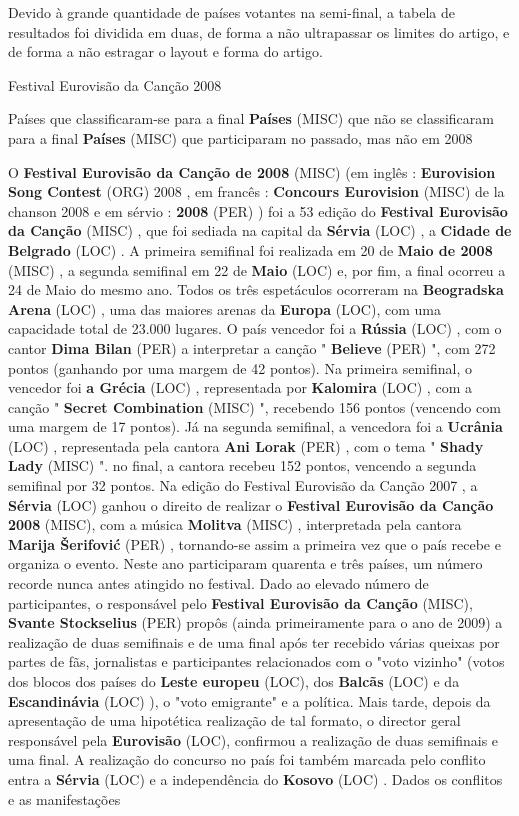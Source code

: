 \documentclass[12pt,a4paper]{article}
\begin{document}
Devido à grande quantidade de países votantes na semi-final, a tabela de resultados foi dividida em duas, de forma a não ultrapassar os limites do artigo, e de forma a não estragar o layout e forma do artigo.



Festival Eurovisão da Canção 2008



Países que classificaram-se para a final \textbf{Países} (MISC) que não se classificaram para a final \textbf{Países} (MISC) que participaram no passado, mas não em 2008

O \textbf{Festival Eurovisão da Canção de 2008} (MISC) (em inglês : \textbf{Eurovision Song Contest} (ORG) 2008 , em francês : \textbf{Concours Eurovision} (MISC) de la chanson 2008 e em sérvio : \textbf{  2008} (PER) ) foi a 53 edição do \textbf{Festival Eurovisão da Canção} (MISC) , que foi sediada na capital da \textbf{Sérvia} (LOC) , a \textbf{Cidade de Belgrado} (LOC) . A primeira semifinal foi realizada em 20 de \textbf{Maio de 2008} (MISC) , a segunda semifinal em 22 de \textbf{Maio} (LOC) e, por fim, a final ocorreu a 24 de Maio do mesmo ano. Todos os três espetáculos ocorreram na \textbf{Beogradska Arena} (LOC) , uma das maiores arenas da \textbf{Europa} (LOC), com uma capacidade total de 23.000 lugares. O país vencedor foi a \textbf{Rússia} (LOC) , com o cantor \textbf{Dima Bilan} (PER) a interpretar a canção " \textbf{Believe} (PER) ", com 272 pontos (ganhando por uma margem de 42 pontos). Na primeira semifinal, o vencedor foi \textbf{a Grécia} (LOC) , representada por \textbf{Kalomira} (LOC) , com a canção " \textbf{Secret Combination} (MISC) ", recebendo 156 pontos (vencendo com uma margem de 17 pontos). Já na segunda semifinal, a vencedora foi a \textbf{Ucrânia} (LOC) , representada pela cantora \textbf{Ani Lorak} (PER) , com o tema " \textbf{Shady Lady} (MISC) ". no final, a cantora recebeu 152 pontos, vencendo a segunda semifinal por 32 pontos. Na edição do Festival Eurovisão da Canção 2007 , a \textbf{Sérvia} (LOC) ganhou o direito de realizar o \textbf{Festival Eurovisão da Canção 2008} (MISC), com a música \textbf{Molitva} (MISC) , interpretada pela cantora \textbf{Marija Šerifović} (PER) , tornando-se assim a primeira vez que o país recebe e organiza o evento. Neste ano participaram quarenta e três países, um número recorde nunca antes atingido no festival. Dado ao elevado número de participantes, o responsável pelo \textbf{Festival Eurovisão da Canção} (MISC), \textbf{Svante Stockselius} (PER) propôs (ainda primeiramente para o ano de 2009) a realização de duas semifinais e de uma final após ter recebido várias queixas por partes de fãs, jornalistas e participantes relacionados com o "voto vizinho" (votos dos blocos dos países do \textbf{Leste europeu} (LOC), dos \textbf{Balcãs} (LOC) e da \textbf{Escandinávia} (LOC) ), o "voto emigrante" e a política. Mais tarde, depois da apresentação de uma hipotética realização de tal formato, o director geral responsável pela \textbf{Eurovisão} (LOC), confirmou a realização de duas semifinais e uma final. A realização do concurso no país foi também marcada pelo conflito entra a \textbf{Sérvia} (LOC) e a independência do \textbf{Kosovo} (LOC) . Dados os conflitos e as manifestações 
\end{document}
